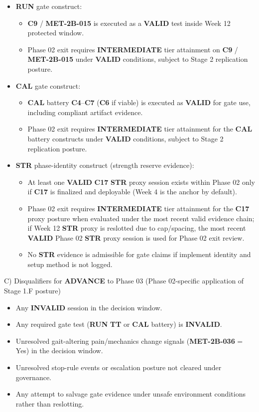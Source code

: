 \documentclass[10pt]{article}
\begin{document}
\begin{itemize}
\item \textbf{RUN} gate construct:
\begin{itemize}
\item \textbf{C9} / \textbf{MET-2B-015} is executed as a \textbf{VALID} test inside Week 12 protected window.
\item Phase 02 exit requires \textbf{INTERMEDIATE} tier attainment on \textbf{C9} / \textbf{MET-2B-015} under \textbf{VALID} conditions, subject to Stage 2 replication posture.
\end{itemize}
\item \textbf{CAL} gate construct:
\begin{itemize}
\item \textbf{CAL} battery \textbf{C4}–\textbf{C7} (\textbf{C6} if viable) is executed as \textbf{VALID} for gate use, including compliant artifact evidence.
\item Phase 02 exit requires \textbf{INTERMEDIATE} tier attainment for the \textbf{CAL} battery constructs under \textbf{VALID} conditions, subject to Stage 2 replication posture.
\end{itemize}
\item \textbf{STR} phase-identity construct (strength reserve evidence):
\begin{itemize}
\item At least one \textbf{VALID} \textbf{C17} \textbf{STR} proxy session exists within Phase 02 only if \textbf{C17} is finalized and deployable (Week 4 is the anchor by default).
\item Phase 02 exit requires \textbf{INTERMEDIATE} tier attainment for the \textbf{C17} proxy posture when evaluated under the most recent valid evidence chain; if Week 12 \textbf{STR} proxy is reslotted due to cap/spacing, the most recent \textbf{VALID} Phase 02 \textbf{STR} proxy session is used for Phase 02 exit review.
\item No \textbf{STR} evidence is admissible for gate claims if implement identity and setup method is not logged.
\end{itemize}
\end{itemize}

C) Disqualifiers for \textbf{ADVANCE} to Phase 03 (Phase 02-specific application of Stage 1.F posture)

\begin{itemize}
\item Any \textbf{INVALID} session in the decision window.
\item Any required gate test (\textbf{RUN} \textbf{TT} or \textbf{CAL} battery) is \textbf{INVALID}.
\item Unresolved gait-altering pain/mechanics change signals (\textbf{MET-2B-036} = Yes) in the decision window.
\item Unresolved stop-rule events or escalation posture not cleared under governance.
\item Any attempt to salvage gate evidence under unsafe environment conditions rather than reslotting.
\end{itemize}
\end{document}
